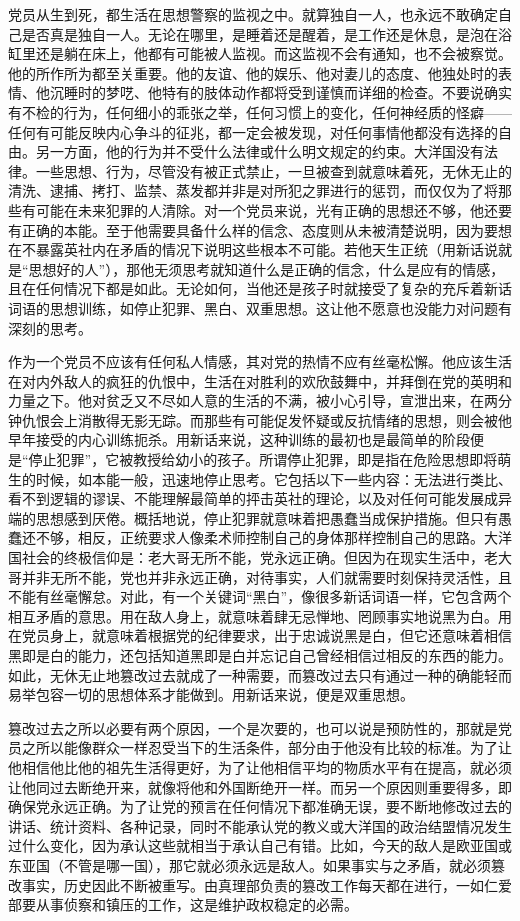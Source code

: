党员从生到死，都生活在思想警察的监视之中。就算独自一人，也永远不敢确定自己是否真是独自一人。无论在哪里，是睡着还是醒着，是工作还是休息，是泡在浴缸里还是躺在床上，他都有可能被人监视。而这监视不会有通知，也不会被察觉。他的所作所为都至关重要。他的友谊、他的娱乐、他对妻儿的态度、他独处时的表情、他沉睡时的梦呓、他特有的肢体动作都将受到谨慎而详细的检查。不要说确实有不检的行为，任何细小的乖张之举，任何习惯上的变化，任何神经质的怪癖——任何有可能反映内心争斗的征兆，都一定会被发现，对任何事情他都没有选择的自由。另一方面，他的行为并不受什么法律或什么明文规定的约束。大洋国没有法律。一些思想、行为，尽管没有被正式禁止，一旦被查到就意味着死，无休无止的清洗、逮捕、拷打、监禁、蒸发都并非是对所犯之罪进行的惩罚，而仅仅为了将那些有可能在未来犯罪的人清除。对一个党员来说，光有正确的思想还不够，他还要有正确的本能。至于他需要具备什么样的信念、态度则从未被清楚说明，因为要想在不暴露英社内在矛盾的情况下说明这些根本不可能。若他天生正统（用新话说就是``思想好的人''），那他无须思考就知道什么是正确的信念，什么是应有的情感，且在任何情况下都是如此。无论如何，当他还是孩子时就接受了复杂的充斥着新话词语的思想训练，如停止犯罪、黑白、双重思想。这让他不愿意也没能力对问题有深刻的思考。

作为一个党员不应该有任何私人情感，其对党的热情不应有丝毫松懈。他应该生活在对内外敌人的疯狂的仇恨中，生活在对胜利的欢欣鼓舞中，并拜倒在党的英明和力量之下。他对贫乏又不尽如人意的生活的不满，被小心引导，宣泄出来，在两分钟仇恨会上消散得无影无踪。而那些有可能促发怀疑或反抗情绪的思想，则会被他早年接受的内心训练扼杀。用新话来说，这种训练的最初也是最简单的阶段便是``停止犯罪''，它被教授给幼小的孩子。所谓停止犯罪，即是指在危险思想即将萌生的时候，如本能一般，迅速地停止思考。它包括以下一些内容：无法进行类比、看不到逻辑的谬误、不能理解最简单的抨击英社的理论，以及对任何可能发展成异端的思想感到厌倦。概括地说，停止犯罪就意味着把愚蠢当成保护措施。但只有愚蠢还不够，相反，正统要求人像柔术师控制自己的身体那样控制自己的思路。大洋国社会的终极信仰是：老大哥无所不能，党永远正确。但因为在现实生活中，老大哥并非无所不能，党也并非永远正确，对待事实，人们就需要时刻保持灵活性，且不能有丝毫懈怠。对此，有一个关键词``黑白''，像很多新话词语一样，它包含两个相互矛盾的意思。用在敌人身上，就意味着肆无忌惮地、罔顾事实地说黑为白。用在党员身上，就意味着根据党的纪律要求，出于忠诚说黑是白，但它还意味着相信黑即是白的能力，还包括知道黑即是白并忘记自己曾经相信过相反的东西的能力。如此，无休无止地篡改过去就成了一种需要，而篡改过去只有通过一种的确能轻而易举包容一切的思想体系才能做到。用新话来说，便是双重思想。

篡改过去之所以必要有两个原因，一个是次要的，也可以说是预防性的，那就是党员之所以能像群众一样忍受当下的生活条件，部分由于他没有比较的标准。为了让他相信他比他的祖先生活得更好，为了让他相信平均的物质水平有在提高，就必须让他同过去断绝开来，就像将他和外国断绝开一样。而另一个原因则重要得多，即确保党永远正确。为了让党的预言在任何情况下都准确无误，要不断地修改过去的讲话、统计资料、各种记录，同时不能承认党的教义或大洋国的政治结盟情况发生过什么变化，因为承认这些就相当于承认自己有错。比如，今天的敌人是欧亚国或东亚国（不管是哪一国），那它就必须永远是敌人。如果事实与之矛盾，就必须篡改事实，历史因此不断被重写。由真理部负责的篡改工作每天都在进行，一如仁爱部要从事侦察和镇压的工作，这是维护政权稳定的必需。

